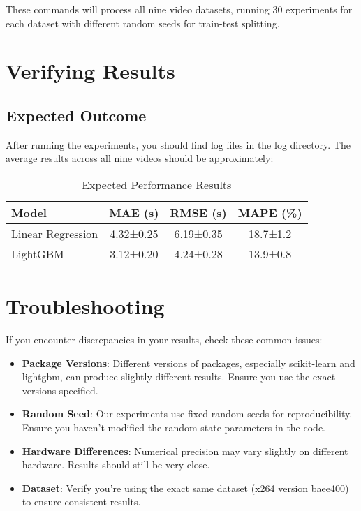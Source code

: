 \documentclass[10pt]{article}
\begin{document}
These commands will process all nine video datasets, running 30 experiments for each dataset with different random seeds for train-test splitting.

\section{Verifying Results}

\subsection{Expected Outcome}
After running the experiments, you should find log files in the log directory. The average results across all nine videos should be approximately:

\begin{table}[h]
\centering
\caption{Expected Performance Results}
\begin{tabular}{lccc}
\toprule
\textbf{Model} & \textbf{MAE (s)} & \textbf{RMSE (s)} & \textbf{MAPE (\%)} \\
\midrule
Linear Regression & 4.32±0.25 & 6.19±0.35 & 18.7±1.2 \\
LightGBM & 3.12±0.20 & 4.24±0.28 & 13.9±0.8 \\
\bottomrule
\end{tabular}
\end{table}








\section{Troubleshooting}

If you encounter discrepancies in your results, check these common issues:

\begin{itemize}
    \item \textbf{Package Versions}: Different versions of packages, especially scikit-learn and lightgbm, can produce slightly different results. Ensure you use the exact versions specified.
    
    \item \textbf{Random Seed}: Our experiments use fixed random seeds for reproducibility. Ensure you haven't modified the random state parameters in the code.
    
    \item \textbf{Hardware Differences}: Numerical precision may vary slightly on different hardware. Results should still be very close.
    
    \item \textbf{Dataset}: Verify you're using the exact same dataset (x264 version baee400) to ensure consistent results.
\end{itemize}
\end{document}
